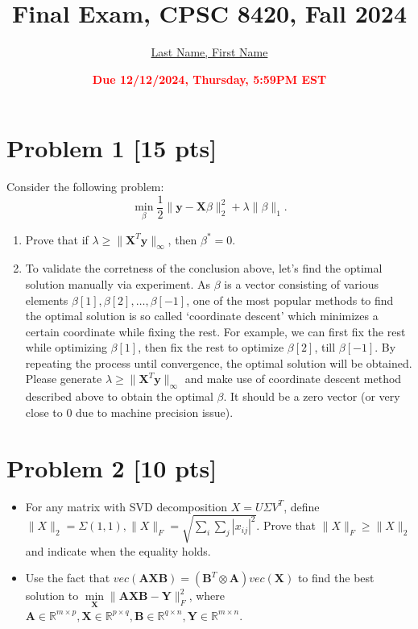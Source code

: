 \documentclass[11pt]{article}
\title{{\bf Final Exam, CPSC 8420, Fall 2024}}
\author{\Large\underline{Last Name, First Name}}%
\date{\textbf{\Large\textcolor{red}{Due 12/12/2024, Thursday, 5:59PM EST}}}
\newcommand{\R}{\mathbb{R}}
\newcommand{\mtx}[1]{\mathbf{#1}}
\newcommand{\vct}[1]{\mathbf{#1}}
\def \mA {\mtx{A}}
\def \mB {\mtx{B}}
\def \mX {\mtx{X}}
\def \mY {\mtx{Y}}
\def \vy {\vct{y}}
\def \R {\mathbb{R}}
\begin{document}
\maketitle

\section*{Problem 1 [15 pts]}
Consider the following problem:
\begin{equation}
\min_{\beta} \frac{1}{2}\|\vy-\mX\beta\|^2_2+\lambda\|\beta\|_1.
\end{equation}
\begin{enumerate}
	\item Prove that if $\lambda\ge\|\mX^T\vy\|_\infty$, then $\beta^*=0$. 
	\item To validate the corretness of the conclusion above, let's find the optimal solution manually via experiment. As $\beta$ is a vector consisting of various elements $\beta[1],\beta[2],\dots,\beta[-1]$, one of the most popular methods to find the optimal solution is so called `coordinate descent' which minimizes a certain coordinate while fixing the rest. For example, we can first fix the rest while optimizing $\beta[1]$, then fix the rest to optimize $\beta[2]$, till $\beta[-1]$. By repeating the process until convergence, the optimal solution will be obtained. Please generate $\lambda\ge\|\mX^T\vy\|_\infty$ and make use of coordinate descent method described above to obtain the optimal $\beta$. It should be a zero vector (or very close to $0$ due to machine precision issue).
\end{enumerate}

\newpage
\section*{Problem 2 [10 pts]}
\begin{itemize}
	\item For any matrix with SVD decomposition $X=U\Sigma V^T$, define $\|X\|_2=\Sigma(1,1), \|X\|_F=\sqrt{\sum_i\sum_j |x_{ij}|^2}$. Prove that $\|X\|_F\ge \|X\|_2$ and indicate when the equality holds.
	\item Use the fact that $vec(\mA\mX\mB)=(\mB^T\otimes\mA)vec(\mX)$ to find the best solution to $\min\limits_{\mX} \|\mA\mX\mB-\mY\|_F^2$, where $\mA\in\R^{m\times p}, \mX\in\R^{p\times q}, \mB\in\R^{q\times n}, \mY\in\R^{m\times n}$.
\end{itemize}


\newpage
\end{document}
